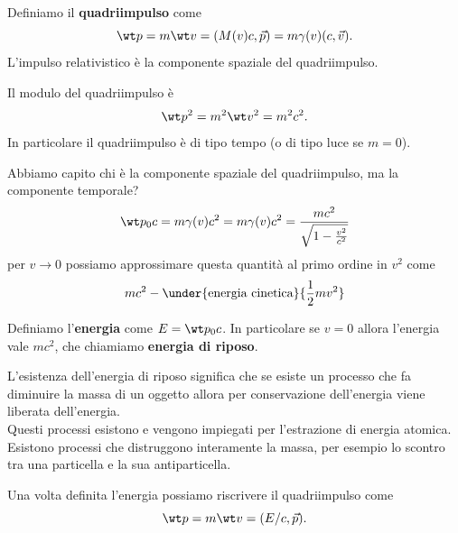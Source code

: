 \begin{definition}[Quadriimpulso]
Definiamo il \textbf{quadriimpulso} come
\[\wt p=m\wt v=(M(v)c,\vec p)=m\gamma(v)(c,\vec v).\]
L'impulso relativistico \`e la componente spaziale del quadriimpulso.
\end{definition}

\begin{remark}
Il modulo del quadriimpulso \`e
\[\wt p^2=m^2\wt v^2=m^2c^2.\]
In particolare il quadriimpulso \`e di tipo tempo (o di tipo luce se $m=0$).
\end{remark}

\noindent Abbiamo capito chi \`e la componente spaziale del quadriimpulso, ma la componente temporale?
\[\wt p_0c=m\gamma(v)c^2=m\gamma(v)c^2=\frac{mc^2}{\sqrt{1-\frac{v^2}{c^2}}}\]
per $v\to 0$ possiamo approssimare questa quantit\`a al primo ordine in $v^2$ come
\[mc^2-\under{\text{energia cinetica}}{\frac12 mv^2}\]

\begin{definition}[Energia]
Definiamo l'\textbf{energia} come $E=\wt p_0c$. In particolare se $v=0$ allora l'energia vale $mc^2$, che chiamiamo \textbf{energia di riposo}.
\end{definition}

\begin{remark}
L'esistenza dell'energia di riposo significa che se esiste un processo che fa diminuire la massa di un oggetto allora per conservazione dell'energia viene liberata dell'energia.\\
Questi processi esistono e vengono impiegati per l'estrazione di energia atomica.\\
Esistono processi che distruggono interamente la massa, per esempio lo scontro tra una particella e la sua antiparticella.
\end{remark}

\begin{remark}
Una volta definita l'energia possiamo riscrivere il quadriimpulso come
\[\wt p=m\wt v=(E/c,\vec p).\]
\end{remark}